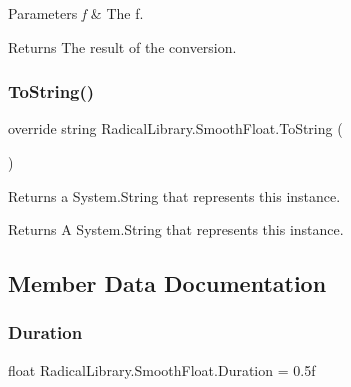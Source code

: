 \begin{DoxyParams}{Parameters}
{\em f} & The f.\\
\hline
\end{DoxyParams}
\begin{DoxyReturn}{Returns}
The result of the conversion.
\end{DoxyReturn}
\mbox{\label{class_radical_library_1_1_smooth_float_aa900ef9074a4ae88ce65a2a562b98433}} 
\subsubsection{\texorpdfstring{To\+String()}{ToString()}}
{\footnotesize\ttfamily override string Radical\+Library.\+Smooth\+Float.\+To\+String (\begin{DoxyParamCaption}{ }\end{DoxyParamCaption})\hspace{0.3cm}{\ttfamily [inline]}}



Returns a System.\+String that represents this instance. 

\begin{DoxyReturn}{Returns}
A System.\+String that represents this instance.
\end{DoxyReturn}


\subsection{Member Data Documentation}
\mbox{\label{class_radical_library_1_1_smooth_float_aabe3fb912c052ec1ba1897a990f14292}} 
\subsubsection{\texorpdfstring{Duration}{Duration}}
{\footnotesize\ttfamily float Radical\+Library.\+Smooth\+Float.\+Duration = 0.\+5f}



